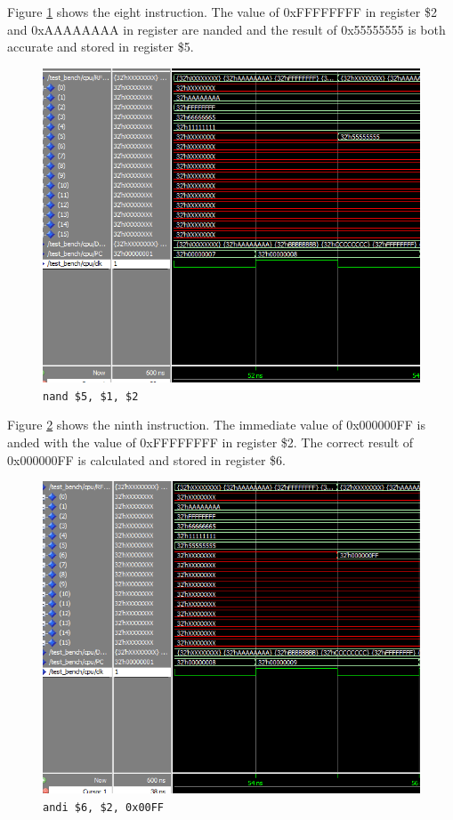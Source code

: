 \documentclass[12pt]{article}
\begin{document}
Figure \ref{fig:8-instr} shows the eight instruction. The value of 0xFFFFFFFF in register \$2 and 0xAAAAAAAA in register are nanded and the result of 0x55555555 is both accurate and stored in register \$5.
\begin{figure}[H]
\centering
\includegraphics[width=\linewidth]{simulation/8-instr}
\caption{\texttt{nand \$5, \$1, \$2}}
\label{fig:8-instr}
\end{figure}


Figure \ref{fig:9-instr} shows the ninth instruction. The immediate value of 0x000000FF is anded with the value of 0xFFFFFFFF in register \$2. The correct result of 0x000000FF is calculated and stored in register \$6.
\begin{figure}[H]
\centering
\includegraphics[width=\linewidth]{simulation/9-instr}
\caption{\texttt{andi \$6, \$2, 0x00FF}}
\label{fig:9-instr}
\end{figure}
\end{document}
